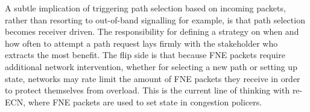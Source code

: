 A subtle implication of triggering path selection based on incoming packets, rather than resorting to out-of-band signalling for example, is that path selection becomes receiver driven. The responsibility for defining a strategy on when and how often to attempt a path request lays firmly with the stakeholder who extracts the most benefit. The flip side is that because \ac{FNE} packets require additional network intervention, whether for selecting a new path or setting up state, networks may rate limit the amount of \ac{FNE} packets they receive in order to protect themselves from overload. This is the current line of thinking with re-\ac{ECN}, where \ac{FNE} packets are used to set state in congestion policers.

